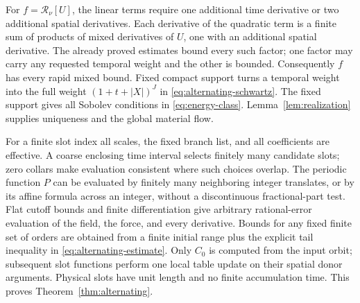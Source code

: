 For $f=\mathcal R_\nu[U]$, the linear terms require one additional
time derivative or two additional spatial derivatives.  Each derivative
of the quadratic term is a finite sum of products of mixed derivatives
of $U$, one with an additional spatial derivative.  The already proved
estimates bound every such factor; one factor may carry any requested
temporal weight and the other is bounded.  Consequently $f$ has every
rapid mixed bound.  Fixed compact support turns a temporal weight into
the full weight $(1+t+|X|)^J$ in
\eqref{eq:alternating-schwartz}.  The fixed support gives all Sobolev conditions in
\eqref{eq:energy-class}. Lemma~\ref{lem:realization} supplies
uniqueness and the global material flow.

For a finite slot index all scales, the fixed branch list, and all
coefficients are effective.  A coarse enclosing time interval selects
finitely many candidate slots; zero collars make evaluation consistent
where such choices overlap.  The periodic function $P$ can be evaluated
by finitely many neighboring integer translates, or by its affine
formula across an integer, without a discontinuous fractional-part
test.  Flat cutoff bounds and finite differentiation give arbitrary
rational-error evaluation of the field, the force, and every derivative.
Bounds for any fixed finite set of orders are obtained from a finite
initial range plus the explicit tail inequality in
\eqref{eq:alternating-estimate}.  Only $C_0$ is computed from
the input orbit; subsequent slot functions perform one local table
update on their spatial donor arguments.  Physical slots have unit
length and no finite accumulation time. This proves
Theorem~\ref{thm:alternating}.
